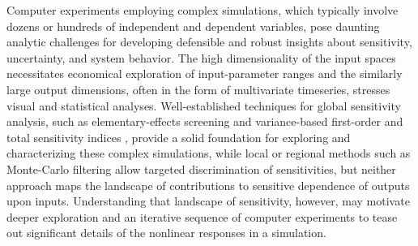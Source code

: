 \documentclass[12pt]{article}
\begin{document}
Computer experiments employing complex simulations, which typically involve dozens or hundreds of independent and dependent variables, pose daunting analytic challenges for developing defensible and robust insights about sensitivity, uncertainty, and system behavior. The high dimensionality of the input spaces necessitates economical exploration of input-parameter ranges and the similarly large output dimensions, often in the form of multivariate timeseries, stresses visual and statistical analyses. Well-established techniques for global sensitivity analysis, such as elementary-effects screening and variance-based first-order and total sensitivity indices \cite{saltelli_global_2008}, provide a solid foundation for exploring and characterizing these complex simulations, while local or regional methods such as Monte-Carlo filtering \cite{borgonovo_sensitivity_2016} allow targeted discrimination of sensitivities, but neither approach maps the landscape of contributions to sensitive dependence of outputs upon inputs. Understanding that landscape of sensitivity, however, may motivate deeper exploration and an iterative sequence of computer experiments to tease out significant details of the nonlinear responses in a simulation.
\end{document}

